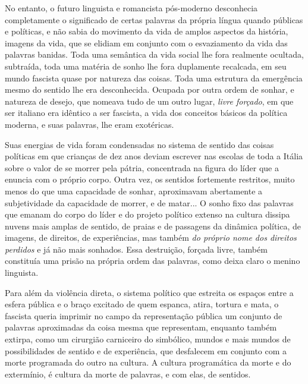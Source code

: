 No entanto, o futuro linguista e romancista pós-moderno desconhecia
completamente o significado de certas palavras da própria língua quando
públicas e políticas, e não sabia do movimento da vida de amplos
aspectos da história, imagens da vida, que se elidiam em conjunto com o
esvaziamento da vida das palavras banidas. Toda uma semântica da vida
social lhe fora realmente ocultada, subtraída, toda uma matéria de sonho
lhe fora duplamente recalcada, em seu mundo fascista quase por natureza
das coisas. Toda uma estrutura da emergência mesmo do sentido lhe era
desconhecida. Ocupada por outra ordem de sonhar, e natureza de desejo,
que nomeava tudo de um outro lugar, \emph{livre forçado}, em que ser
italiano era idêntico a ser fascista, a vida dos conceitos básicos da
política moderna, e suas palavras, lhe eram exotéricas.

Suas energias de vida foram condensadas no sistema de sentido das coisas
políticas em que crianças de dez anos deviam escrever nas escolas de
toda a Itália sobre o valor de se morrer pela pátria, concentrada na
figura do líder que a enuncia com o próprio corpo. Outra vez, os
sentidos fortemente restritos, muito menos do que uma capacidade de
sonhar, aproximavam abertamente a subjetividade da capacidade de morrer,
e de matar... O sonho fixo das palavras que emanam do corpo do líder e
do projeto político extenso na cultura dissipa nuvens mais amplas de
sentido, de praias e de passagens da dinâmica política, de imagens, de
direitos, de experiências, mas também \emph{do próprio nome dos direitos
perdidos} e já não mais sonhados. Essa destruição, forçada livre, também
constituía uma prisão na própria ordem das palavras, como deixa claro o
menino linguista.

Para além da violência direta, o sistema político que estreita os
espaços entre a esfera pública e o braço excitado de quem espanca,
atira, tortura e mata, o fascista queria imprimir no campo da
representação pública um conjunto de palavras aproximadas da coisa mesma
que representam, enquanto também extirpa, como um cirurgião carniceiro
do simbólico, mundos e mais mundos de possibilidades de sentido e de
experiência, que desfalecem em conjunto com a morte programada do outro
na cultura. A cultura programática da morte e do extermínio, é cultura
da morte de palavras, e com elas, de sentidos.

